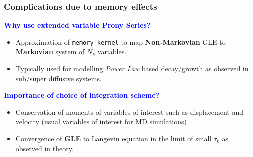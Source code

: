 \documentclass[a4paper,10pt]{beamer}
\begin{document}
	\begin{frame}
		\frametitle{Complications due to memory effects}
		\small
		\textcolor{blue}{\textbf{Why use extended variable Prony Series?}}
		
		\begin{itemize}
			\item {Approximation of \texttt{memory kernel} to map {\textbf{Non-Markovian}} GLE to {\textbf{Markovian}} system of $N_{k}$ variables.}
			\item {Typically used for modelling \textit{Power Law} based decay/growth as observed in sub/super diffusive systems.}
		\end{itemize}
		
		\textcolor{blue}{\textbf{Importance of choice of integration scheme?}}
		
		\begin{itemize}
			\item {Conservation of moments of variables of interest such as displacement and velocity (usual variables of interest for MD simulations)}
			\item {Convergence of \textbf{GLE} to Langevin equation in the limit of small $\tau_{k}$ as observed in theory.}
		\end{itemize}
	\end{frame}
\end{document}
